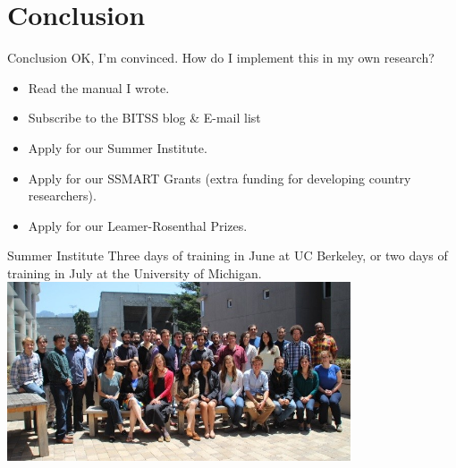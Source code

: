 \documentclass{beamer}
\begin{document}
\section{Conclusion}
\begin{frame}{Conclusion}
OK, I'm convinced. How do I implement this in my own research?

\begin{itemize}[<.->]
\item Read the manual I wrote.\href{https://github.com/garretchristensen/BestPracticesManual}{}
\item Subscribe to the BITSS blog \& E-mail list \href{https://bitss.org/blog}{}
\item Apply for our Summer Institute. \href{http://www.bitss.org/events/summer-institute/}{}
\item Apply for our SSMART Grants (extra funding for developing country researchers). \href{http://www.bitss.org/ssmart-grants/}{}

\item Apply for our Leamer-Rosenthal Prizes. \href{http://www.bitss.org/lr-prizes/}{}
\end{itemize}
\end{frame}

\begin{frame}{Summer Institute}
Three days of training in June at UC Berkeley, or two days of training in July at the University of Michigan.
\includegraphics[width=4in]{../Images/bitss-2014-cohort2.jpg}
\end{frame}
\end{document}
